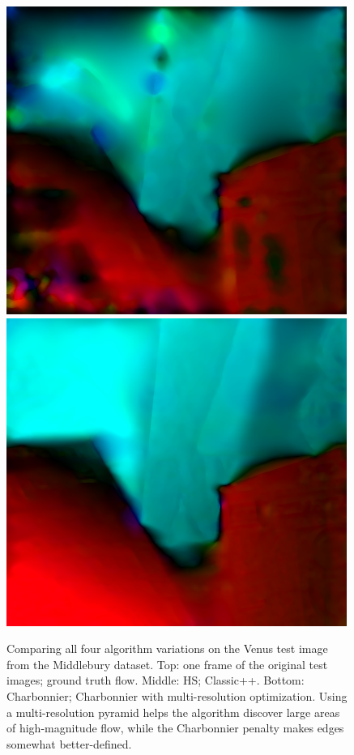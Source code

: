 \documentclass[10pt,twocolumn,letterpaper]{article}
\begin{document}
\begin{figure}
\includegraphics[width=0.48 \columnwidth] {venus_3.png} 
\includegraphics[width=0.48 \columnwidth] {venus_4.png}

\caption{Comparing all four algorithm variations on the Venus test image from the Middlebury dataset.  Top: one frame of the original test images; ground truth flow.  Middle: HS; Classic++.  Bottom: Charbonnier; Charbonnier with multi-resolution optimization.  Using a multi-resolution pyramid helps the algorithm discover large areas of high-magnitude flow, while the Charbonnier penalty makes edges somewhat better-defined.}
\label{fig:venus}
\end{figure}

{\small


}
\end{document}
